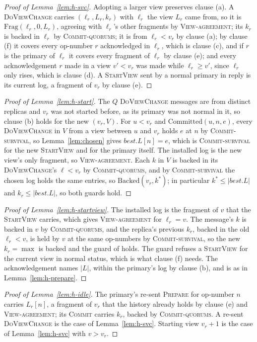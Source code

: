 \documentclass[11pt,a4paper]{article}
\theoremstyle{plain}
\theoremstyle{definition}
\theoremstyle{remark}
\newcommand{\msg}[1]{\textsc{#1}}
\newcommand{\dvc}{\msg{DoViewChange}}
\newcommand{\Frag}{\mathrm{Frag}}
\newcommand{\Committed}{\mathrm{Committed}}
\newcommand{\Backed}{\mathrm{Backed}}
\newcommand{\OneLog}{\textsc{View-agreement}}
\newcommand{\CommitsBacked}{\textsc{Commit-quorums}}
\newcommand{\Survival}{\textsc{Commit-survival}}
\begin{document}
\begin{proof}[Proof of Lemma~\ref{lem:h-svc}]
Adopting a larger view preserves clause (a). A \dvc{} carries
$(\ell_r, L_r, k_r)$ with $\ell_r$ the view $L_r$ came from, so it is
$\Frag(\ell_r, 0, L_r)$, agreeing with $\ell_r$'s other fragments by
\OneLog; its $k_r$ is backed in $\ell_r$ by \CommitsBacked; it is from
$\ell_r < v_r$ by clause (a); by clause (f) it covers every op-number
$r$ acknowledged in $\ell_r$, which is clause (c), and if $r$ is the
primary of $\ell_r$ it covers every fragment of $\ell_r$ by clause (e);
and every acknowledgement $r$ made in a view $v' < v_r$ was made while
$\ell_r \ge v'$, since $\ell_r$ only rises, which is clause (d). A
\msg{StartView} sent by a normal primary in reply is its current log, a
fragment of $v_r$ by clause (e).
\end{proof}

\begin{proof}[Proof of Lemma~\ref{lem:h-start}]
The $Q$ \dvc{} messages are from distinct replicas and $v_r$ was not started
before, as its primary was not normal in it, so clause (b) holds for the
new $(v_r, V)$. For $u < v_r$ and $\Committed(u, n, e)$, every \dvc{} in
$V$ from a view between $u$ and $v_r$ holds $e$ at $n$ by \Survival, so
Lemma~\ref{lem:chosen} gives $\mathit{best}.L[n] = e$, which is
\Survival{} for the new \msg{StartView} and for the primary itself. The
installed log is the new view's only fragment, so \OneLog. Each $k$ in
$V$ is backed in its \dvc{}'s $\ell < v_r$ by \CommitsBacked, and by
\Survival{} the chosen log holds the same entries, so
$\Backed(v_r, k^*)$; in particular $k^* \le |\mathit{best}.L|$ and
$k_r \le |\mathit{best}.L|$, so both guards hold.
\end{proof}

\begin{proof}[Proof of Lemma~\ref{lem:h-startview}]
The installed log is the fragment of $v$ that the \msg{StartView}
carries, which gives \OneLog{} for $\ell_r = v$. The message's $k$ is
backed in $v$ by \CommitsBacked, and the replica's previous $k_r$,
backed in the old $\ell_r < v$, is held by $v$ at the same op-numbers by
\Survival, so the new $k_r = \max$ is backed and the guard of
 holds. The guard refuses a \msg{StartView} for the
current view in normal status, which is what clause (f) needs. The
acknowledgement names $|L|$, within the primary's log by clause (b), and
is as in Lemma~\ref{lem:h-prepare}.
\end{proof}

\begin{proof}[Proof of Lemma~\ref{lem:h-idle}]
The primary's re-sent \msg{Prepare} for op-number $n$ carries $L_r[n]$,
a fragment of $v_r$ that the history already holds by clause (e) and
\OneLog; its \msg{Commit} carries $k_r$, backed by \CommitsBacked. A
re-sent \dvc{} is the case of Lemma~\ref{lem:h-svc}. Starting view
$v_r + 1$ is the case of Lemma~\ref{lem:h-svc} with $v > v_r$.
\end{proof}
\end{document}
